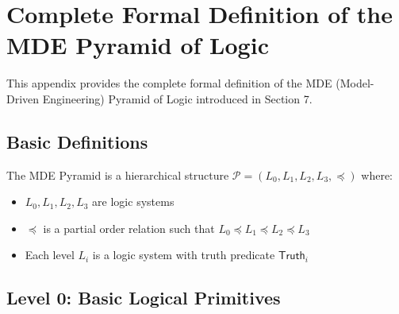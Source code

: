 \appendix
\section{Complete Formal Definition of the MDE Pyramid of Logic}
\label{app:mde-pyramid}

This appendix provides the complete formal definition of the MDE (Model-Driven Engineering) Pyramid of Logic introduced in Section 7.

\subsection{Basic Definitions}

\begin{definition}
The MDE Pyramid is a hierarchical structure $\mathcal{P} = (L_0, L_1, L_2, L_3, \preceq)$ where:
\begin{itemize}
\item $L_0, L_1, L_2, L_3$ are logic systems
\item $\preceq$ is a partial order relation such that $L_0 \preceq L_1 \preceq L_2 \preceq L_3$
\item Each level $L_i$ is a logic system with truth predicate $\mathsf{Truth}_i$
\end{itemize}
\end{definition}

\subsection{Level 0: Basic Logical Primitives}

